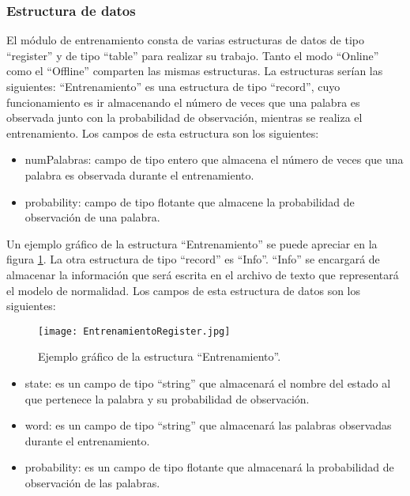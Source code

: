 \subsubsection{Estructura de datos}
El módulo de entrenamiento consta de varias estructuras de datos de
tipo ``register'' y de tipo ``table'' para realizar su trabajo. Tanto el modo
``Online'' como el ``Offline'' comparten las mismas estructuras.
La estructuras serían las siguientes:
``Entrenamiento'' es una estructura de tipo ``record'', cuyo funcionamiento es ir almacenando el número de veces que una palabra es observada junto con la probabilidad de observación, mientras se realiza el entrenamiento. Los
campos de esta estructura son los siguientes:

\begin{itemize}
\item numPalabras: campo de tipo entero que almacena el número de veces
que una palabra es observada durante el entrenamiento.
\item probability: campo de tipo flotante que almacene la probabilidad de observación de una palabra.
\end{itemize}

Un ejemplo gráfico de la estructura ``Entrenamiento'' se puede apreciar
en la figura \ref{fig:figEntrenamiento}.
La otra estructura de tipo ``record'' es ``Info''. ``Info'' se encargará de
almacenar la información que será escrita en el archivo de texto que representará el modelo de normalidad. Los campos de esta estructura de datos
son los siguientes:

\begin{figure}[tb]
\begin{center}
\texttt{[image: EntrenamientoRegister.jpg]}
\caption{Ejemplo gráfico de la estructura ``Entrenamiento''.}
\label{fig:figEntrenamiento}
\end{center}
\end{figure}	

\begin{itemize}
\item state: es un campo de tipo ``string'' que almacenará el nombre del
estado al que pertenece la palabra y su probabilidad de observación.
\item word: es un campo de tipo ``string'' que almacenará las palabras observadas durante el entrenamiento.
\item probability: es un campo de tipo flotante que almacenará la probabilidad de observación de las palabras.
\end{itemize}

